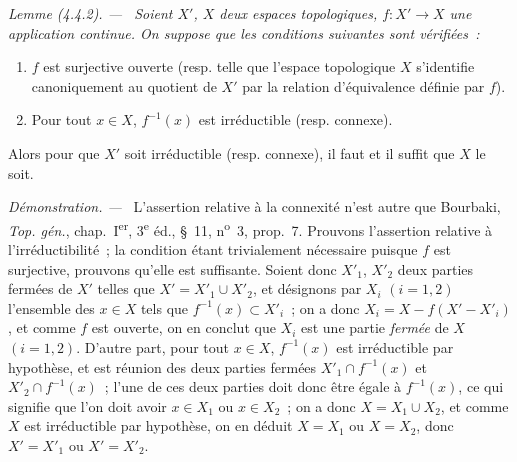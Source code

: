 \documentclass[10pt,oneside]{book}
\makeatletter
\newcommand{\oldpage}[2][]{%
  \setcounter{footnote}{0}%
  \marginpar{\scriptsize\textbf{#1}~|~#2}\ignorespaces}
\newenvironment{lemma}[1][]{%
  \par\medskip\noindent\itshape Lemme (#1). ---\ }{\par}
\newenvironment{proof}{%
  \par\medskip\noindent\textit{Démonstration. ---\ }}{\par}
\newcommand{\EGAReaderTarget}[2]{\hypertarget{#1}{}\@bsphack\begingroup\def\@currentHref{#1}\label{#2}\endgroup\@esphack}
\makeatother
\begin{document}
\begin{lemma}[4.4.2]
\EGAReaderTarget{ega4.c04.lem.4-4-2}{IV.2.4.4.2-fr}
Soient $X'$, $X$ deux espaces topologiques, $f:X'\to X$ une application
continue. On suppose que les conditions suivantes sont vérifiées~:
\begin{enumerate}
\item[(i)] $f$ est surjective ouverte (resp. telle que l'espace topologique
$X$ s'identifie canoniquement au quotient de $X'$ par la relation d'équivalence
définie par $f$).

\oldpage[IV-2]{60}

\item[(ii)] Pour tout $x\in X$, $f^{-1}(x)$ est irréductible (resp. connexe).
\end{enumerate}
Alors pour que $X'$ soit irréductible (resp. connexe), il faut et il suffit
que $X$ le soit.
\end{lemma}

\begin{proof}
L'assertion relative à la connexité n'est autre que Bourbaki,
\emph{Top. gén.}, chap.~I\textsuperscript{er}, 3\textsuperscript{e} éd.,
\S~11, n\textsuperscript{o}~3, prop.~7. Prouvons l'assertion relative à
l'irréductibilité~; la condition étant trivialement nécessaire puisque $f$
est surjective, prouvons qu'elle est suffisante. Soient donc $X'_1$, $X'_2$
deux parties fermées de $X'$ telles que $X'=X'_1\cup X'_2$, et désignons par
$X_i$ $(i=1,2)$ l'ensemble des $x\in X$ tels que $f^{-1}(x)\subset X'_i$~; on
a donc $X_i=X-f(X'-X'_i)$, et comme $f$ est ouverte, on en conclut que $X_i$
est une partie \emph{fermée} de $X$ $(i=1,2)$. D'autre part, pour tout
$x\in X$, $f^{-1}(x)$ est irréductible par hypothèse, et est réunion des deux
parties fermées $X'_1\cap f^{-1}(x)$ et $X'_2\cap f^{-1}(x)$~; l'une de ces
deux parties doit donc être égale à $f^{-1}(x)$, ce qui signifie que l'on doit
avoir $x\in X_1$ ou $x\in X_2$~; on a donc $X=X_1\cup X_2$, et comme $X$ est
irréductible par hypothèse, on en déduit $X=X_1$ ou $X=X_2$, donc
$X'=X'_1$ ou $X'=X'_2$.
\end{proof}
\end{document}
